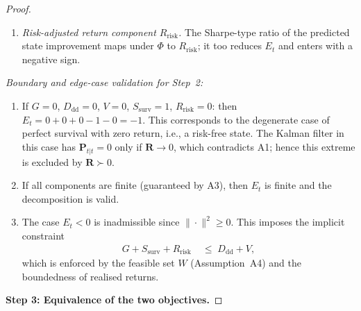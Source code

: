 \documentclass[12pt,openany]{book}
\numberwithin{equation}{chapter}
\theoremstyle{plain}
\theoremstyle{definition}
\theoremstyle{remark}
\def\mathcal#1{#1}%
\begin{document}
\begin{proof}
\begin{enumerate}
  \item \emph{Risk-adjusted return component $R_{\mathrm{risk}}$.}
        The Sharpe-type ratio of the predicted state improvement
        maps under $\Phi$ to $R_{\mathrm{risk}}$; it too reduces
        $\mathcal{E}_t$ and enters with a negative sign.
\end{enumerate}

\emph{Boundary and edge-case validation for Step~2:}
\begin{enumerate}
  \item If $G=0$, $D_{\mathrm{dd}}=0$, $V=0$,
        $S_{\mathrm{surv}}=1$, $R_{\mathrm{risk}}=0$:
        then $\mathcal{E}_t = 0 + 0 + 0 - 1 - 0 = -1$.
        This corresponds to the degenerate case of perfect
        survival with zero return, i.e., a risk-free state.
        The Kalman filter in this case has $\mathbf{P}_{t|t}=0$
        only if $\mathbf{R}\to 0$, which contradicts A1; hence
        this extreme is excluded by $\mathbf{R}\succ 0$.
  \item If all components are finite (guaranteed by A3), then
        $\mathcal{E}_t$ is finite and the decomposition is valid.
  \item The case $\mathcal{E}_t < 0$ is inadmissible since
        $\|\cdot\|^2\ge 0$.  This imposes the implicit constraint
        \begin{align}
          G + S_{\mathrm{surv}} + R_{\mathrm{risk}}
          &\;\le\;
          D_{\mathrm{dd}} + V,
          \label{eq:admissibility-constraint}
        \end{align}
        which is enforced by the feasible set $\mathcal{W}$
        (Assumption~A4) and the boundedness of realised returns.
\end{enumerate}

\medskip
\noindent\textbf{Step 3: Equivalence of the two objectives.}


\end{proof}
\end{document}
